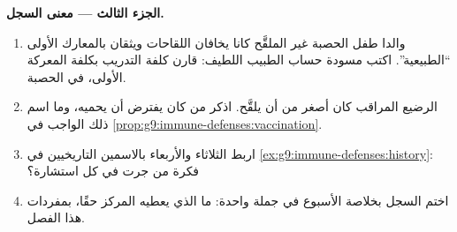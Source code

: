 \begin{problem}
\medskip\noindent\textbf{الجزء الثالث --- معنى
السجل.}
\begin{enumerate}[resume]
  \item والدا طفل الحصبة غير الملقَّح كانا يخافان
        اللقاحات ويثقان بالمعارك الأولى ``الطبيعية''.
        اكتب مسودة حساب الطبيب اللطيف: قارن كلفة التدريب
        بكلفة المعركة الأولى، في الحصبة.
  \item الرضيع المراقب كان أصغر من أن يلقَّح. اذكر من
        كان يفترض أن يحميه، وما اسم ذلك الواجب في
        \cref{prop:g9:immune-defenses:vaccination}.
  \item اربط الثلاثاء والأربعاء بالاسمين التاريخيين في
        \cref{ex:g9:immune-defenses:history}: فكرة من
        جرت في كل استشارة؟
  \item اختم السجل بخلاصة الأسبوع في جملة واحدة: ما الذي
        يعطيه المركز حقًا، بمفردات هذا الفصل.
\end{enumerate}
\end{problem}
